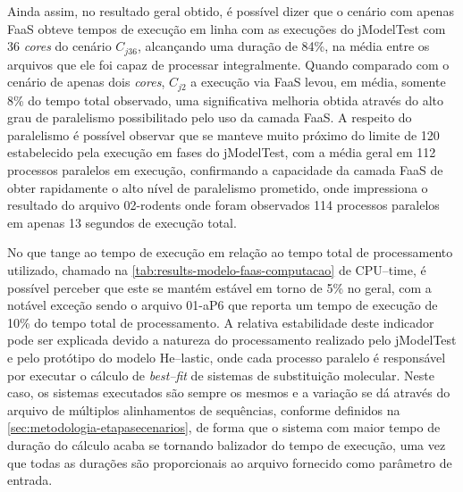 \documentclass[english,brazilian]{UNISINOSmonografia} %
\begin{document}
Ainda assim, no resultado geral obtido, é possível dizer que o cenário com apenas FaaS obteve tempos de execução em linha com as execuções do jModelTest com 36 \textit{cores} do cenário $C_{j36}$, alcançando uma duração de 84\%, na média entre os arquivos que ele foi capaz de processar integralmente.
%
Quando comparado com o cenário de apenas dois \textit{cores}, $C_{j2}$ a execução via FaaS levou, em média, somente 8\% do tempo total observado, uma significativa melhoria obtida através do alto grau de paralelismo possibilitado pelo uso da camada FaaS.
%
A respeito do paralelismo é possível observar que se manteve muito próximo do limite de 120 estabelecido pela execução em fases do jModelTest, com a média geral em 112 processos paralelos em execução, confirmando a capacidade da camada FaaS de obter rapidamente o alto nível de paralelismo prometido, onde impressiona o resultado do arquivo 02-rodents onde foram observados 114 processos paralelos em apenas 13 segundos de execução total.



No que tange ao tempo de execução em relação ao tempo total de processamento utilizado, chamado na \autoref{tab:results-modelo-faas-computacao} de CPU--time, é possível perceber que este se mantém estável em torno de 5\% no geral, com a notável exceção sendo o arquivo 01-aP6 que reporta um tempo de execução de 10\% do tempo total de processamento.
%
A relativa estabilidade deste indicador pode ser explicada devido a natureza do processamento realizado pelo jModelTest e pelo protótipo do modelo \textsf{He}--lastic, onde cada processo paralelo é responsável por executar o cálculo de \textit{best--fit} de sistemas de substituição molecular.
%
Neste caso, os sistemas executados são sempre os mesmos e a variação se dá através do arquivo de múltiplos alinhamentos de sequências, conforme definidos na \autoref{sec:metodologia-etapasecenarios}, de forma que o sistema com maior tempo de duração do cálculo acaba se tornando balizador do tempo de execução, uma vez que todas as durações são proporcionais ao arquivo fornecido como parâmetro de entrada.
\end{document}
